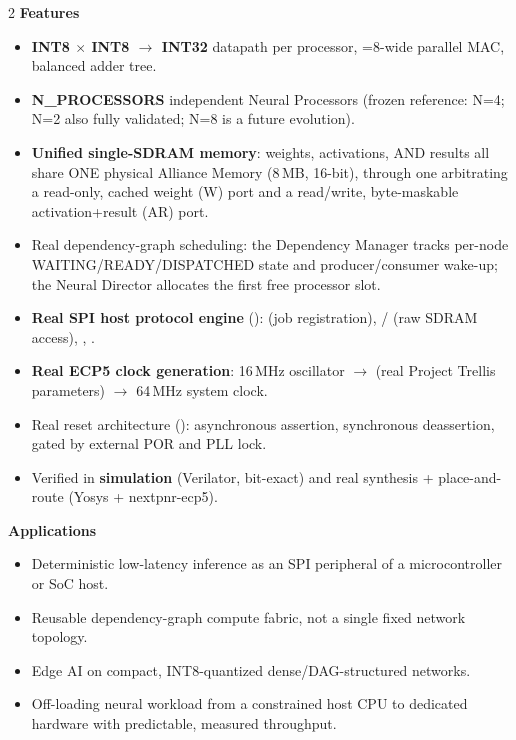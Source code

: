 \vspace{8pt}
\begin{multicols}{2}
{\color{fnDark}\large\bfseries Features}\\[2pt]
{\footnotesize
\begin{itemize}[leftmargin=1.1em]
\item \textbf{INT8 $\times$ INT8 $\to$ INT32} datapath per processor,
      =8-wide parallel MAC, balanced adder tree.
\item \textbf{N\_PROCESSORS} independent Neural Processors (frozen
      reference: N=4; N=2 also fully validated; N=8 is a future
      evolution).
\item \textbf{Unified single-SDRAM memory}: weights, activations, AND
      results all share ONE physical Alliance Memory
       (8\,MB, 16-bit), through one
       arbitrating a read-only,
      cached weight (W) port and a read/write, byte-maskable
      activation+result (AR) port.
\item Real dependency-graph scheduling: the Dependency Manager tracks
      per-node WAITING/READY/DISPATCHED state and producer/consumer
      wake-up; the Neural Director allocates the first free processor
      slot.
\item \textbf{Real SPI host protocol engine}
      ():  (job
      registration), / (raw SDRAM
      access), , .
\item \textbf{Real ECP5 clock generation}: 16\,MHz oscillator
      $\to$  (real Project Trellis 
      parameters) $\to$ 64\,MHz system clock.
\item Real reset architecture (): asynchronous
      assertion, synchronous deassertion, gated by external POR and
      PLL lock.
\item Verified in \textbf{simulation} (Verilator, bit-exact) and real
      synthesis + place-and-route (Yosys + nextpnr-ecp5).
\end{itemize}}

\columnbreak

{\color{fnDark}\large\bfseries Applications}\\[2pt]
{\footnotesize
\begin{itemize}[leftmargin=1.1em]
\item Deterministic low-latency inference as an SPI peripheral of a
      microcontroller or SoC host.
\item Reusable dependency-graph compute fabric, not a single fixed
      network topology.
\item Edge AI on compact, INT8-quantized dense/DAG-structured
      networks.
\item Off-loading neural workload from a constrained host CPU to
      dedicated hardware with predictable, measured throughput.
\end{itemize}}


\end{multicols}
